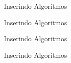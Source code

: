 \documentclass{libs/ufc_format}
\begin{document}
\begin{frame}{Inserindo Algoritmos}
    \lstset{language=Python}
    
\end{frame}

\begin{frame}{Inserindo Algoritmos}
    
\end{frame}

\begin{frame}{Inserindo Algoritmos}
    
\end{frame}

\begin{frame}{Inserindo Algoritmos}
    
\end{frame}
\end{document}
